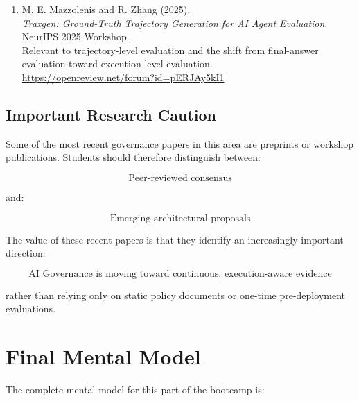 \documentclass[11pt,a4paper]{article}
\begin{document}
\begin{enumerate}
\item M. E. Mazzolenis and R. Zhang (2025).\\
\textit{Traxgen: Ground-Truth Trajectory Generation for AI Agent Evaluation}.\\
NeurIPS 2025 Workshop.\\
Relevant to trajectory-level evaluation and the shift from final-answer evaluation toward execution-level evaluation.\\
\url{https://openreview.net/forum?id=pERJAy5kI1}

\end{enumerate}

\subsection*{Important Research Caution}

Some of the most recent governance papers in this area are preprints or workshop publications. Students should therefore distinguish between:

\[
\text{Peer-reviewed consensus}
\]

and:

\[
\text{Emerging architectural proposals}
\]

The value of these recent papers is that they identify an increasingly important direction:

\[
\boxed{
\text{AI Governance is moving toward continuous, execution-aware evidence}
}
\]

rather than relying only on static policy documents or one-time pre-deployment evaluations.

\section{Final Mental Model}

The complete mental model for this part of the bootcamp is:

\begin{center}
\end{center}
\end{document}
